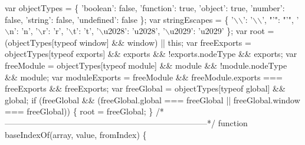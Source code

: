 \begin{DoxyCodeInclude}
\textcolor{stringliteral}{  var objectTypes = \{}
\textcolor{stringliteral}{    '}\textcolor{keywordtype}{boolean}\textcolor{stringliteral}{': false,}
\textcolor{stringliteral}{    '}\textcolor{keyword}{function}\textcolor{stringliteral}{': true,}
\textcolor{stringliteral}{    '}\textcolor{keywordtype}{object}\textcolor{stringliteral}{': true,}
\textcolor{stringliteral}{    '}number\textcolor{stringliteral}{': false,}
\textcolor{stringliteral}{    '}\textcolor{keywordtype}{string}\textcolor{stringliteral}{': false,}
\textcolor{stringliteral}{    '}undefined\textcolor{stringliteral}{': false}
\textcolor{stringliteral}{  \};}
\textcolor{stringliteral}{}
\textcolor{stringliteral}{  var stringEscapes = \{}
\textcolor{stringliteral}{    '}\(\backslash\)\(\backslash\)\textcolor{stringliteral}{': '}\(\backslash\)\(\backslash\)\textcolor{stringliteral}{',}
\textcolor{stringliteral}{    "'}\textcolor{stringliteral}{": "}\textcolor{stringliteral}{'",}
\textcolor{stringliteral}{    '}\(\backslash\)n\textcolor{stringliteral}{': '}n\textcolor{stringliteral}{',}
\textcolor{stringliteral}{    '}\(\backslash\)r\textcolor{stringliteral}{': '}r\textcolor{stringliteral}{',}
\textcolor{stringliteral}{    '}\(\backslash\)t\textcolor{stringliteral}{': '}t\textcolor{stringliteral}{',}
\textcolor{stringliteral}{    '}\(\backslash\)u2028\textcolor{stringliteral}{': '}u2028\textcolor{stringliteral}{',}
\textcolor{stringliteral}{    '}\(\backslash\)u2029\textcolor{stringliteral}{': '}u2029\textcolor{stringliteral}{'}
\textcolor{stringliteral}{  \};}
\textcolor{stringliteral}{}
\textcolor{stringliteral}{  var root = (objectTypes[typeof window] && window) || this;}
\textcolor{stringliteral}{}
\textcolor{stringliteral}{  var freeExports = objectTypes[typeof exports] && exports && !exports.nodeType && exports;}
\textcolor{stringliteral}{}
\textcolor{stringliteral}{  var freeModule = objectTypes[typeof module] && module && !module.nodeType && module;}
\textcolor{stringliteral}{}
\textcolor{stringliteral}{  var moduleExports = freeModule && freeModule.exports === freeExports && freeExports;}
\textcolor{stringliteral}{}
\textcolor{stringliteral}{  var freeGlobal = objectTypes[typeof global] && global;}
\textcolor{stringliteral}{  if (freeGlobal && (freeGlobal.global === freeGlobal || freeGlobal.window === freeGlobal)) \{}
\textcolor{stringliteral}{    root = freeGlobal;}
\textcolor{stringliteral}{  \}}
\textcolor{stringliteral}{}
\textcolor{stringliteral}{  /*--------------------------------------------------------------------------*/}
\textcolor{stringliteral}{}
\textcolor{stringliteral}{  function baseIndexOf(array, value, fromIndex) \{}

\end{DoxyCodeInclude}
